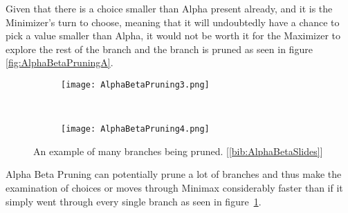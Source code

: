 Given that there is a choice smaller than Alpha present already, and it is the Minimizer’s turn to choose, 
meaning that it will undoubtedly have a chance to pick a value smaller than Alpha, 
it would not be worth it for the Maximizer to explore the rest of the branch and the branch is pruned as seen 
in figure \ref{fig:AlphaBetaPruningA}.
\begin{figure}[!t]
    \centering %
    \begin{subfigure}[t]{0.3\textwidth}
        \texttt{[image: AlphaBetaPruning3.png]}
    \end{subfigure}
    ~
    \begin{subfigure}[t]{0.3\textwidth}
        \texttt{[image: AlphaBetaPruning4.png]}
    \end{subfigure}
    \caption{An example of many branches being pruned. [\ref{bib:AlphaBetaSlides}]} %
    \label{fig:AlphaBetaPruningB}
  \end{figure}
Alpha Beta Pruning can potentially prune a lot of branches and 
thus make the examination of choices or moves through Minimax considerably faster 
than if it simply went through every single branch as seen in figure~\ref{fig:AlphaBetaPruningB}.
